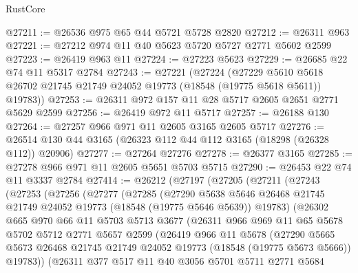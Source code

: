 \begin{lexlean}{RustCore}
\begin{coremodule}
@27211 := @26536 @975 @65 @44 @5721 @5728 @2820
@27212 := @26311 @963
@27221 := @27212 @974 @11 @40 @5623 @5720 @5727 @2771 @5602 @2599
@27223 := @26419 @963 @11
@27224 := @27223 @5623
@27229 := @26685 @22 @74 @11 @5317 @2784
@27243 := @27221
    (@27224
      (@27229 @5610 @5618 @26702 @21745 @21749 @24052 @19773 (@18548 (@19775 @5618 @5611)) @19783))
@27253 := @26311 @972 @157 @11 @28 @5717 @2605 @2651 @2771 @5629 @2599
@27256 := @26419 @972 @11 @5717
@27257 := @26188 @130
@27264 := @27257 @966 @971 @11 @2605 @3165 @2605 @5717
@27276 := @26514 @130 @44 @3165 (@26323 @112 @44 @112 @3165 (@18298 (@26328 @112)) @20906)
@27277 := @27264 @27276
@27278 := @26377 @3165
@27285 := @27278 @966 @971 @11 @2605 @5651 @5703 @5715
@27290 := @26453 @22 @74 @11 @3337 @2784
@27414 := @26212
    (@27197
      (@27205
        (@27211
          (@27243
            (@27253
              (@27256
                (@27277
                  (@27285
                    (@27290
                      @5638
                      @5646
                      @26468
                      @21745
                      @21749
                      @24052
                      @19773
                      (@18548 (@19775 @5646 @5639))
                      @19783)
                    (@26302
                      @665
                      @970
                      @66
                      @11
                      @5703
                      @5713
                      @3677
                      (@26311
                        @966
                        @969
                        @11
                        @65
                        @5678
                        @5702
                        @5712
                        @2771
                        @5657
                        @2599
                        (@26419
                          @966
                          @11
                          @5678
                          (@27290
                            @5665
                            @5673
                            @26468
                            @21745
                            @21749
                            @24052
                            @19773
                            (@18548 (@19775 @5673 @5666))
                            @19783))
                        (@26311
                          @377
                          @517
                          @11
                          @40
                          @3056
                          @5701
                          @5711
                          @2771
                          @5684

\end{coremodule}
\end{lexlean}

